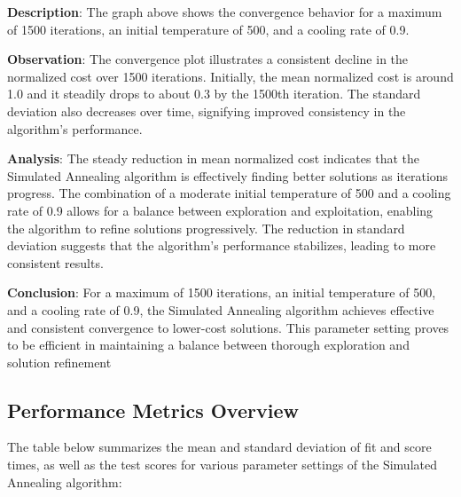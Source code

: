 \documentclass[
]{article}
\begin{document}
    \textbf{Description}: The graph above shows the convergence behavior for a maximum of 1500 iterations, an initial temperature of 500, and a cooling rate of 0.9.

    \textbf{Observation}: The convergence plot illustrates a consistent decline in the normalized cost over 1500 iterations. Initially, the mean normalized cost is around 1.0 and it steadily drops to about 0.3 by the 1500th iteration. The standard deviation also decreases over time, signifying improved consistency in the algorithm’s performance.

    \textbf{Analysis}: The steady reduction in mean normalized cost indicates that the Simulated Annealing algorithm is effectively finding better solutions as iterations progress. The combination of a moderate initial temperature of 500 and a cooling rate of 0.9 allows for a balance between exploration and exploitation, enabling the algorithm to refine solutions progressively. The reduction in standard deviation suggests that the algorithm's performance stabilizes, leading to more consistent results.

    \textbf{Conclusion}: For a maximum of 1500 iterations, an initial temperature of 500, and a cooling rate of 0.9, the Simulated Annealing algorithm achieves effective and consistent convergence to lower-cost solutions. This parameter setting proves to be efficient in maintaining a balance between thorough exploration and solution refinement

    \subsection{Performance Metrics Overview}

    The table below summarizes the mean and standard deviation of fit and score times, as well as the test scores for various parameter settings of the Simulated Annealing algorithm:
\end{document}
